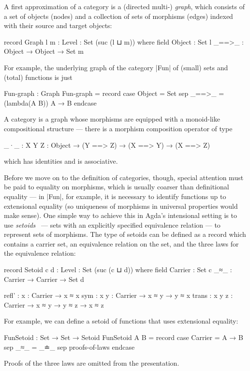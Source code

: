 A first approximation of a category is a (directed multi-) \emph{graph}, which consists of a set of objects (nodes) and a collection of sets of morphisms (edges) indexed with their source and target objects:
\begin{code}
record Graph {l m : Level} : Set (suc (l ⊔ m)) where
  field
    Object    :  Set l
    _==>_     :  Object → Object → Set m
\end{code}
For example, the underlying graph of the category |Fun| of (small) sets and (total) functions is just
\begin{code}
Fun-graph : Graph
Fun-graph = record  case  Object  = Set
                    sep   _==>_   = (lambda(A B)) A → B endcase
\end{code}
A category is a graph whose morphisms are equipped with a monoid-like compositional structure --- there is a morphism composition operator of type
\begin{code}
_·_  : {X Y Z : Object} → (Y ==> Z) → (X ==> Y) → (X ==> Z)
\end{code}
which has identities and is associative.


Before we move on to the definition of categories, though, special attention must be paid to equality on morphisms, which is usually coarser than definitional equality --- in |Fun|, for example, it is necessary to identify functions up to extensional equality (so uniqueness of morphisms in universal properties would make sense).
One simple way to achieve this in Agda's intensional setting is to use \emph{setoids}~\citep{Barthe-setoids} --- sets with an explicitly specified equivalence relation --- to represent sets of morphisms.
The type of setoids can be defined as a record which contains a carrier set, an equivalence relation on the set, and the three laws for the equivalence relation:
\begin{code}
record Setoid {c d : Level} : Set (suc (c ⊔ d)) where
  field
    Carrier  : Set c
    _≈_      : Carrier → Carrier → Set d

    refl'  : {x : Carrier} → x ≈ x
    sym    : {x y : Carrier} → x ≈ y → y ≈ x
    trans  : {x y z : Carrier} → x ≈ y → y ≈ z → x ≈ z
\end{code}
For example, we can define a setoid of functions that uses extensional equality:
\begin{code}
FunSetoid : Set → Set → Setoid
FunSetoid A B = record  case  Carrier  =  A → B
                        sep   _≈_      =  _≐_
                        sep   proofs-of-laws endcase
\end{code}
Proofs of the three laws are omitted from the presentation.

